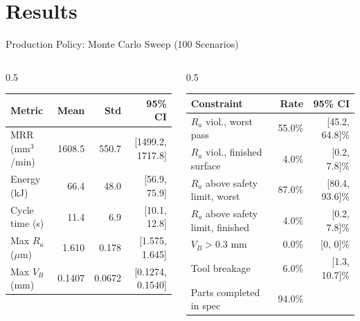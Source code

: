 ﻿\documentclass[11pt,aspectratio=169]{beamer}
\newcommand{\MRR}{\mathrm{MRR}}
\newcommand{\Ra}{R_a}
\newcommand{\VB}{V_B}
\begin{document}
\section{Results}

\begin{frame}{Production Policy: Monte Carlo Sweep (100 Scenarios)}
    \small
    \begin{columns}[T]
        \begin{column}{0.5\textwidth}
            \centering
            \scriptsize
            \begin{tabular}{@{}lrrr@{}}
            \toprule
            \textbf{Metric} & \textbf{Mean} & \textbf{Std} & \textbf{95\% CI} \\
            \midrule
            $\MRR$ (mm$^3$/min) & 1608.5 & 550.7 & [1499.2, 1717.8] \\
            Energy (kJ) & 66.4 & 48.0 & [56.9, 75.9] \\
            Cycle time (s) & 11.4 & 6.9 & [10.1, 12.8] \\
            Max $\Ra$ ($\mu$m) & 1.610 & 0.178 & [1.575, 1.645] \\
            Max $\VB$ (mm) & 0.1407 & 0.0672 & [0.1274, 0.1540] \\
            \bottomrule
            \end{tabular}
        \end{column}
        \begin{column}{0.5\textwidth}
            \centering
            \scriptsize
            \begin{tabular}{@{}lrr@{}}
            \toprule
            \textbf{Constraint} & \textbf{Rate} & \textbf{95\% CI} \\
            \midrule
            $\Ra$ viol., worst pass & 55.0\% & [45.2, 64.8]\% \\
            $\Ra$ viol., finished surface & 4.0\% & [0.2, 7.8]\% \\
            $\Ra$ above safety limit, worst & 87.0\% & [80.4, 93.6]\% \\
            $\Ra$ above safety limit, finished & 4.0\% & [0.2, 7.8]\% \\
            $\VB > 0.3$ mm & \alert{0.0\%} & [0, 0]\% \\
            Tool breakage & 6.0\% & [1.3, 10.7]\% \\
            Parts completed in spec & 94.0\% & \\
            \bottomrule
            \end{tabular}
        \end{column}
    \end{columns}


\end{frame}
\end{document}
